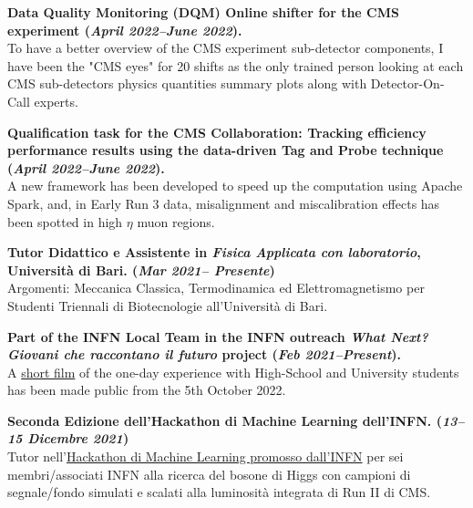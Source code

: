 \documentclass[11pt]{res}
\begin{document}
\begin{resume}
\textbf{Data Quality Monitoring (DQM) Online shifter for the CMS experiment (\textit{April 2022--June 2022}).}\\
To have a better overview of the CMS experiment sub-detector components, I have been the "CMS eyes" for 20 shifts as the only trained person looking at each CMS sub-detectors physics quantities summary plots along with Detector-On-Call experts.

\textbf{Qualification task for the CMS Collaboration: Tracking efficiency performance results using the data-driven Tag and Probe technique (\textit{April 2022--June 2022}).}\\
A new framework has been developed to speed up the computation using Apache Spark, and, in Early Run 3 data, misalignment and miscalibration effects has been spotted in high $\eta$ muon regions.

\textbf{Tutor Didattico e Assistente in \textit{Fisica Applicata con laboratorio}, Università di Bari. (\textit{Mar 2021-- Presente})}\\
Argomenti: Meccanica Classica, Termodinamica ed Elettromagnetismo per Studenti Triennali di Biotecnologie all'Università di Bari.

\textbf{Part of the INFN Local Team in the INFN outreach \textit{What Next? Giovani che raccontano il futuro} project (\textit{Feb 2021--Present}).}\\
A \href{https://next.infn.it/il-cortometraggio/}{short film} of the one-day experience with High-School and University students has been made public from the 5th October 2022.

\textbf{Seconda Edizione dell'Hackathon di Machine Learning dell'INFN. (\textit{13--15 Dicembre 2021})}\\ 
Tutor nell'\href{https://agenda.infn.it/event/28565/contributions/148551/}{Hackathon di Machine Learning promosso dall'INFN} per sei membri/associati INFN alla ricerca del bosone di Higgs con campioni di segnale/fondo simulati e scalati alla luminosità integrata di Run II di CMS.



\end{resume}
\end{document}
